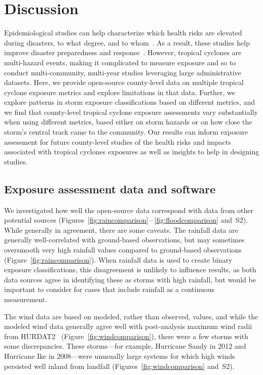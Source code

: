 \section*{Discussion}

Epidemiological studies can help characterize which health risks are elevated
during disasters, to what degree, and to
whom~\parencite{ibrahim2005unfortunate, noji2005disasters}.  As a result, these
studies help improve disaster preparedness and
response~\parencite{noji2005disasters}.  However, tropical cyclones are
multi-hazard events, making it complicated to measure exposure and so to
conduct multi-community, multi-year studies leveraging large administrative
datasets.  Here, we provide open-source county-level data on multiple tropical
cyclone exposure metrics and explore limitations in that data.  
Further, we explore patterns in storm exposure classifications based on
different metrics, and we find that county-level tropical cyclone exposure
assessments vary substantially when using different metrics, based either on
storm hazards or on how close the storm's central track came to the community.
Our results can inform exposure assessment for future county-level studies of
the health risks and impacts associated with tropical cyclones exposures as
well as insights to help in designing studies.  

\subsection*{Exposure assessment data and software}

We investigated how well the open-source data correspond with data from other
potential sources
(Figures~\ref{fig:raincomparison}\,--\,\ref{fig:floodcomparison} and~S2). While
generally in agreement, there are some caveats. The rainfall data are generally
well-correlated with ground-based observations, but may sometimes oversmooth
very high rainfall values compared to ground-based observations
(Figure~\ref{fig:raincomparison}). When rainfall data is used to create binary
exposure classifications, this disagreement is unlikely to influence results,
as both data sources agree in identifying these as storms with high rainfall,
but would be important to consider for cases that include rainfall as a
continuous measurement. 

The wind data are based on modeled, rather than observed, values, and while the
modeled wind data generally agree well with post-analysis maximum wind radii
from \ac{HURDAT2}~\parencite{landsea2013} (Figure~\ref{fig:windcomparison}),
there were a few storms with some discrepancies. These storms---for example, Hurricane Sandy
in 2012 and Hurricane Ike in 2008---were
unusually large systems for which high winds persisted well inland from
landfall (Figures~\ref{fig:windcomparison}
and~S2). 

